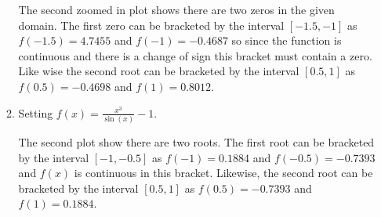 \documentclass[a4paper,11pt]{article}
\begin{document}
\begin{enumerate}
\begin{enumerate}
{		}
			The second zoomed in plot shows there are two zeros in the given 
			domain. The first zero can be bracketed by the interval 
			$[-1.5,-1]$ as 
			$f(-1.5)=4.7455$ and $f(-1)=-0.4687$ so since the function is 
			continuous and there is a change of sign this bracket must 
			contain 
			a zero. Like wise the second root can be bracketed by the 
			interval $[0.5,1]$ 
			as $f(0.5)=-0.4698$ and $f(1)=0.8012$.
			
			
		\item Setting $f(x) = \frac{x^{3}}{\sin(x)} - 1$.
			
		The second plot show there are two roots. The first root can be 
		bracketed by the interval $[-1,-0.5]$ as $f(-1) = 0.1884$ 
		and 
		$f(-0.5)=-0.7393$ and $f(x)$ is continuous in this bracket. Likewise, 
		the second root can be bracketed by the interval $[0.5,1]$ as 
		$f(0.5)=-0.7393$ and 
		$f(1)=0.1884$.
		

\end{enumerate}
\end{enumerate}
\end{document}
